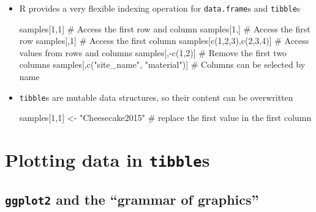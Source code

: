 \documentclass[
  letterpaper,
]{book}
\newenvironment{Shaded}{}{}
\newcommand{\CommentTok}[1]{\textcolor[rgb]{0.42,0.45,0.49}{#1}}
\newcommand{\DecValTok}[1]{\textcolor[rgb]{0.00,0.36,0.77}{#1}}
\newcommand{\FunctionTok}[1]{\textcolor[rgb]{0.44,0.26,0.76}{#1}}
\newcommand{\NormalTok}[1]{\textcolor[rgb]{0.14,0.16,0.18}{#1}}
\newcommand{\OtherTok}[1]{\textcolor[rgb]{0.44,0.26,0.76}{#1}}
\newcommand{\SpecialCharTok}[1]{\textcolor[rgb]{0.00,0.36,0.77}{#1}}
\newcommand{\StringTok}[1]{\textcolor[rgb]{0.01,0.18,0.38}{#1}}
\begin{document}
\begin{itemize}
\item
  R provides a very flexible indexing operation for \texttt{data.frame}s
  and \texttt{tibble}s

\begin{Shaded}
\begin{Highlighting}[]
\NormalTok{samples[}\DecValTok{1}\NormalTok{,}\DecValTok{1}\NormalTok{]                         }\CommentTok{\# Access the first row and column}
\NormalTok{samples[}\DecValTok{1}\NormalTok{,]                          }\CommentTok{\# Access the first row}
\NormalTok{samples[,}\DecValTok{1}\NormalTok{]                          }\CommentTok{\# Access the first column}
\NormalTok{samples[}\FunctionTok{c}\NormalTok{(}\DecValTok{1}\NormalTok{,}\DecValTok{2}\NormalTok{,}\DecValTok{3}\NormalTok{),}\FunctionTok{c}\NormalTok{(}\DecValTok{2}\NormalTok{,}\DecValTok{3}\NormalTok{,}\DecValTok{4}\NormalTok{)]           }\CommentTok{\# Access values from rows and columns}
\NormalTok{samples[,}\SpecialCharTok{{-}}\FunctionTok{c}\NormalTok{(}\DecValTok{1}\NormalTok{,}\DecValTok{2}\NormalTok{)]                    }\CommentTok{\# Remove the first two columns}
\NormalTok{samples[,}\FunctionTok{c}\NormalTok{(}\StringTok{"site\_name"}\NormalTok{, }\StringTok{"material"}\NormalTok{)] }\CommentTok{\# Columns can be selected by name}
\end{Highlighting}
\end{Shaded}
\item
  \texttt{tibble}s are mutable data structures, so their content can be
  overwritten

\begin{Shaded}
\begin{Highlighting}[]
\NormalTok{samples[}\DecValTok{1}\NormalTok{,}\DecValTok{1}\NormalTok{] }\OtherTok{\textless{}{-}} \StringTok{"Cheesecake2015"}     \CommentTok{\# replace the first value in the first column}
\end{Highlighting}
\end{Shaded}
\end{itemize}

\hypertarget{plotting-data-in-tibbles}{%
\section{\texorpdfstring{Plotting data in
\texttt{tibble}s}{Plotting data in tibbles}}\label{plotting-data-in-tibbles}}

\hypertarget{ggplot2-and-the-grammar-of-graphics}{%
\subsection{\texorpdfstring{\texttt{ggplot2} and the ``grammar of
graphics''}{ggplot2 and the ``grammar of graphics''}}\label{ggplot2-and-the-grammar-of-graphics}}
\end{document}
